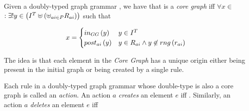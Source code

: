 \begin{definition} Given a doubly-typed graph grammar \doublyTypedGraphGrammarCore{}, we have that \coreGraph{} is a \emph{core graph} iff $\forall x \in$ \coreGraph $: \exists! y \in \left(I^T \uplus \left(\uplus_{ai \in P} R_{ai}\right)\right)$ such that

  \[ x =
    \begin{cases}
      in_{GG}\left(y\right) & y \in I^T\\
      post_{ai}\left(y\right) & y \in R_{ai} \land y \not\in rng\left(r_{ai}\right)\\
    \end{cases}
   \]

  \begin{intuition} The idea is that each element in the \emph{Core Graph} has a unique origin either being present in the initial graph or being created by a single rule.
\end{intuition}

  Each rule in a doubly-typed graph grammar whose double-type is also a core graph is called an \emph{action}. An action $a$ \emph{creates} an element $e$ iff . Similarly, an action $a$ \emph{deletes} an element $e$ iff

\end{definition}

\begin{definition}
\end{definition}

\begin{definition}
\end{definition}

\begin{definition}
\end{definition}

\begin{definition}
\end{definition}

\begin{definition}
\end{definition}

\begin{definition}
\end{definition}

